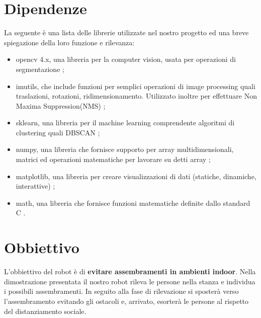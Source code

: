 \documentclass[a4paper]{article}
\begin{document}
	\section{Dipendenze}
	La seguente è una lista delle librerie utilizzate nel nostro progetto ed una breve spiegazione della loro funzione e rilevanza:
	
	\begin{itemize}
		\item opencv 4.x, una libreria per la computer vision, usata per operazioni di segmentazione \cite{opencv};
		\item imutils, che include funzioni per semplici operazioni di image processing quali traslazioni, rotazioni, ridimensionamento. Utilizzato inoltre per effettuare Non Maxima Suppression(NMS) \cite{imutils};
		\item sklearn, una libreria per il machine learning comprendente algoritmi di clustering quali DBSCAN \cite{scikit};
		\item numpy, una libreria che fornisce supporto per array multidimensionali, matrici ed operazioni matematiche per lavorare su detti array \cite{numpy};
		\item matplotlib, una libreria per creare visualizzazioni di dati (statiche, dinamiche, interattive) \cite{matplotlib};
		\item math, una libreria che fornisce funzioni matematiche definite dallo standard C \cite{math}.
	\end{itemize}

	\section{Obbiettivo}
	L'obbiettivo del robot è di \textbf{evitare assembramenti in ambienti indoor}. \newline
	Nella dimostrazione presentata il nostro robot rileva le persone nella stanza e individua i possibili assembramenti. In seguito alla fase di rilevazione si sposterà verso l'assembramento evitando gli ostacoli e, arrivato, esorterà le persone al rispetto del distanziamento sociale.
	
\end{document}
